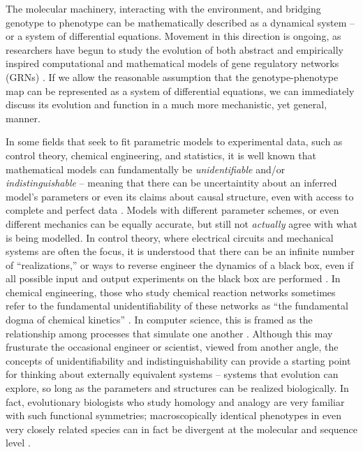 \documentclass[9 pt]{article}
\newcommand{\1}{\mathbbm{1}}
\begin{document}
\begin{multicols}{2}
The molecular machinery, interacting with the environment, and bridging genotype to phenotype
can be mathematically described as a dynamical system -- or a system of differential equations\citep{jaeger2015comet}.
 Movement in this direction is ongoing, as researchers have begun to study 
the evolution of both abstract \citep{wagner1994evolution, wagner1996does,  siegal2002waddington, bergman2003evolutionary} and empirically inspired computational and mathematical models of gene regulatory networks (GRNs) \citep{mjolsness1991connectionist, jaeger2004dynamic, maria1, vitaly1, vitaly2, crombach2016gap, wotton2015quantitative, chertkova2017insilico}. If we allow the reasonable assumption that the genotype-phenotype map can be represented as a system of differential equations, we can immediately discuss its evolution and function in a much more mechanistic, yet general, manner. 

In some fields that seek to fit parametric models to experimental data, such as control
theory, chemical engineering, and statistics, it is well known that mathematical models
can fundamentally be \emph{unidentifiable} and/or \emph{indistinguishable} -- meaning that 
there can be uncertaintity about an inferred model's parameters or even its claims about
causal structure, even with access to complete and perfect data \citep{bellman1970structural, grewal1976identifiability, walter1984structural}. Models with different 
parameter schemes, or even different mechanics can be equally accurate, but still not
\emph{actually} agree with what is being modelled. In control theory, where electrical 
circuits and mechanical systems are often the focus, it is understood that there can be an 
infinite number of ``realizations,'' or ways to reverse engineer the dynamics of a black box,
even if all possible input and output experiments on the black box are performed \citep{kalman1963mathematical, anderson1966equivalence, zadeh1976linear}. In chemical
engineering, those who study chemical reaction networks sometimes refer to the fundamental
unidentifiability of these networks as ``the fundamental dogma of chemical kinetics'' \citep{craciun2008identifiability}. In computer science, this is framed as the relationship among processes that simulate one another \citep{van2004equivalence}.
Although this may frusturate the occasional engineer or scientist, viewed from another angle,
the concepts of unidentifiability and indistinguishability can provide a starting point for
thinking about externally equivalent systems -- systems that evolution can explore, so long
as the parameters and structures can be realized biologically. In fact, evolutionary
biologists who study homology and analogy are very familiar with such functional symmetries; macroscopically identical phenotypes in even very closely related species can in fact be divergent at the molecular and sequence level \citep{true2001developmental, tsong2006evolution, hare2008sepsid, vierstra2014mouse, stergachis2014conservation, taylor2016diverse, matsui2015regulatory}.


\end{multicols}
\end{document}
